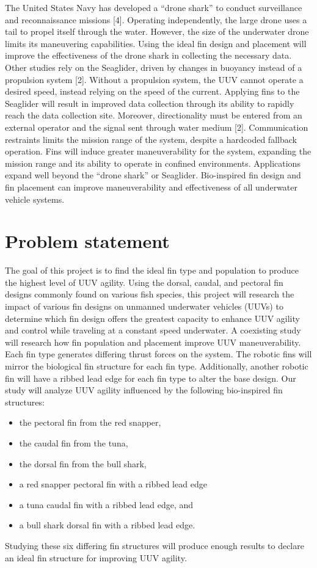 \documentclass{IEEEtran}
\begin{document}
The United States Navy has developed a “drone shark” to conduct surveillance and reconnaissance missions [4].  Operating independently, the large drone uses a tail to propel itself through the water.  However, the size of the underwater drone limits its maneuvering capabilities.  Using the ideal fin design and placement will improve the effectiveness of the drone shark in collecting the necessary data.  Other studies rely on the Seaglider, driven by changes in buoyancy instead of a propulsion system [2].   Without a propulsion system, the UUV cannot operate a desired speed, instead relying on the speed of the current.  Applying fins to the Seaglider will result in improved data collection through its ability to rapidly reach the data collection site.  Moreover, directionality must be entered from an external operator and the signal sent through water medium [2].  Communication restraints limits the mission range of the system, despite a hardcoded fallback operation.    Fins will induce greater maneuverability for the system, expanding the mission range and its ability to operate in confined environments.  Applications expand well beyond the “drone shark” or Seaglider.  Bio-inspired fin design and fin placement can improve maneuverability and effectiveness of all underwater vehicle systems.

\section{Problem statement}
The goal of this project is to find the ideal fin type and population to produce the highest level of UUV agility.  Using the dorsal, caudal, and pectoral fin designs commonly found on various fish species, this project will research the impact of various fin designs on unmanned underwater vehicles (UUVs) to determine which fin design offers the greatest capacity to enhance UUV agility and control while traveling at a constant speed underwater.   A coexisting study will research how fin population and placement improve UUV maneuverability.   Each fin type generates differing thrust forces on the system.  The robotic fins will mirror the biological fin structure for each fin type. Additionally, another robotic fin will have a ribbed lead edge for each fin type to alter the base design.  Our study will analyze UUV agility influenced by the following bio-inspired fin structures:
\begin{itemize}
\item the pectoral fin from the red snapper,
\item the caudal fin from the tuna, 
\item the dorsal fin from the bull shark,
\item a red snapper pectoral fin with a ribbed lead edge
\item a tuna caudal fin with a ribbed lead edge, and
\item a bull shark dorsal fin with a ribbed lead edge.  
\end{itemize}
Studying these six differing fin structures will produce enough results to declare an ideal fin structure for improving UUV agility.   
\end{document}
